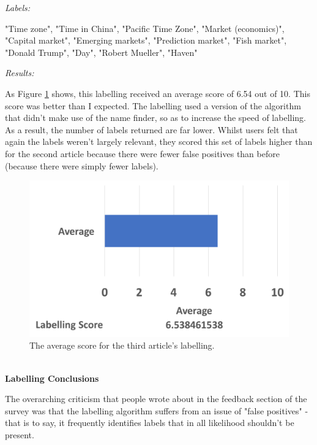 \documentclass[12pt]{article}
\begin{document}
\begin{mdframed}

\emph{Labels:}

"Time zone", "Time in China", "Pacific Time Zone", "Market (economics)", "Capital market", "Emerging markets", "Prediction market", "Fish market", "Donald Trump", "Day", "Robert Mueller", "Haven" \\

\end{mdframed}

\emph{Results:}

As Figure \ref{label3} shows, this labelling received an average score of 6.54 out of 10. This score was better than I expected. The labelling used a version of the algorithm that didn't make use of the name finder, so as to increase the speed of labelling. As a result, the number of labels returned are far lower. Whilst users felt that again the labels weren't largely relevant, they scored this set of labels higher than for the second article because there were fewer false positives than before (because there were simply fewer labels).

\begin{figure}[ht!]
  \centering
    \includegraphics[scale=0.6]{label3score.png}
   \caption[The average score for a labelling]{The average score for the third article's labelling.}
   \label{label3}
\end{figure} 

\textbf{\\ Labelling Conclusions}

The overarching criticism that people wrote about in the feedback section of the survey was that the labelling algorithm suffers from an issue of "false positives" - that is to say, it frequently identifies labels that in all likelihood shouldn't be present.
\end{document}
